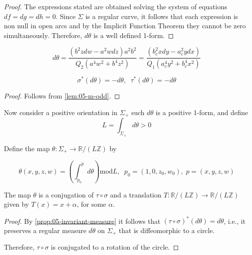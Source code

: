 \begin{proof}
The expressions stated are obtained solving the system of equations $df=dg=dh=0$. Since $\Sigma$ is a regular curve, it follows that each expression is non null in open arcs and by the Implicit Function Theorem   they cannot be zero simultaneously. Therefore, $d\theta$ is a well defined 1-form.
\end{proof}
\begin{remark}
\[ d\theta=\frac{(  b^2   z dw  - a^2  w dz     )   a^2   b^2}{    Q_2   (a^4   w^2 + b^4   z^2)}=\frac{(b_c^2  x dy -a_c^2  y dx         )}{   Q_1   (a_c^4   y^2 + b_c^4   x^2)}
\]
\end{remark}
\begin{proposition}
\[ \sigma^{*}(d\theta)=-d\theta,\;\; \tau^{*}(d\theta)=-d\theta \]
\label{prop:05-invariant-measure}
\end{proposition}

\begin{proof} Follows from \cref{lem:05-m-odd}.
\end{proof}

Now consider a positive  orientation in $\Sigma_+$ such $d\theta$ is a positive 1-form, and define
\[ L=\int_{\Sigma_+ } d\theta >0\]

Define the map
$\theta:\Sigma_+\to \mathbb{R}/(L \mathbb{Z})$ by

\[\theta(x,y,z,w)=\left(\int_{p_0}^p d\theta\right) \text{mod} L ,\;\; p_0=(1,0,z_0,w_0),\; p=(x,y,z,w)\]

\begin{theorem}
The map $\theta $ is a conjugation of $\tau\circ \sigma$ and a translation $T:\mathbb{R}/(L\mathbb{Z})\to \mathbb{R}/(L\mathbb{Z})$ given by $T(x)=x+\alpha$, for some $\alpha$.
\label{thm:05-rotation-cirle}
\end{theorem}

\begin{proof}
By \cref{prop:05-invariant-measure} it follows that $(\tau\circ \sigma)^{*}(d\theta)=d\theta$, i.e., it preserves a regular measure $d\theta$ on $\Sigma_+$ that is diffeomorphic to a circle. 

 

Therefore, $\tau\circ\sigma$ is conjugated to a rotation of the circle.
\end{proof}

